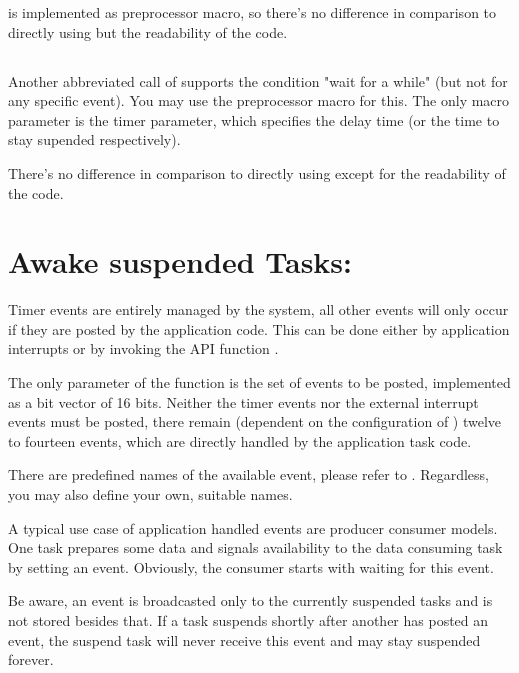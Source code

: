  is implemented as preprocessor macro, so
there's no difference in comparison to directly using
 but the readability of the code.


\subsection{}

Another abbreviated call of  supports the
condition "wait for a while" (but not for any specific event). You may use
the preprocessor macro  for this. The only macro
parameter is the timer parameter, which specifies the delay time (or the
time to stay supended respectively).

There's no difference in comparison to directly using
 except for the readability of the code.


\section{Awake suspended Tasks: }

Timer events are entirely managed by the system, all other events will
only occur if they are posted by the application code. This can be done
either by application interrupts or by invoking the API function
.

The only parameter of the function is the set of events to be posted,
implemented as a bit vector of 16 bits. Neither the timer events nor the
external interrupt events must be posted, there remain (dependent on the
configuration of \rtos{}) twelve to fourteen events, which are directly
handled by the application task code.

There are predefined names of the available event, please refer to
. Regardless, you may also define your own, suitable names.

A typical use case of application handled events are producer consumer
models. One task prepares some data and signals availability to the data
consuming task by setting an event. Obviously, the consumer starts with
waiting for this event.

Be aware, an event is broadcasted only to the currently suspended tasks
and is not stored besides that. If a task suspends shortly after another
has posted an event, the suspend task will never receive this event and
may stay suspended forever.


